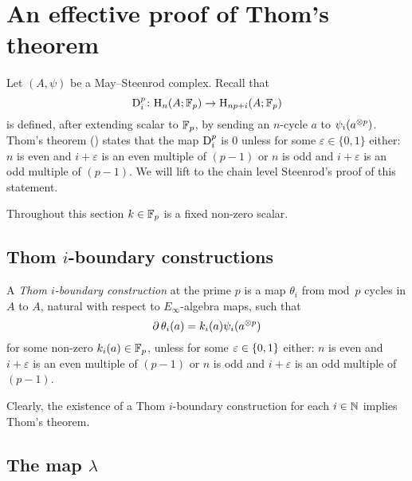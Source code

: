 
\appendix
\section{An effective proof of Thom's theorem}\label{s:thom}


Let $(A,\psi)$ be a May--Steenrod complex.
Recall that
\[
\mathrm{D}_i^p \colon \mathrm{H}_n(A; {\mathbb{F}_p}) \to \mathrm{H}_{np+i}(A; {\mathbb{F}_p})
\]
is defined, after extending scalar to ${\mathbb{F}_p}$, by sending an $n$-cycle $a$ to $\psi_i(a^{\otimes p})$.
Thom's theorem (\cite[218]{steenrod1953cyclic}) states that the map $\mathrm{D}_i^p$ is $0$ unless for some $\varepsilon \in \{0,1\}$ either: $n$ is even and $i+\varepsilon$ is an even multiple of $(p-1)$ or $n$ is odd and $i+\varepsilon$ is an odd multiple of $(p-1)$.
We will lift to the chain level Steenrod's proof of this statement.

Throughout this section $k \in {\mathbb{F}_p}$ is a fixed non-zero scalar.

\subsection{Thom $i$-boundary constructions}

A \textit{Thom $i$-boundary construction} at the prime $p$ is a map $\theta_i$ from mod~$p$ cycles in $A$ to $A$, natural with respect to $E_\infty$-algebra maps, such that
\[
\operatorname{\partial} \theta_i(a) = k_i(a) \psi_i(a^{\otimes p})
\]
for some non-zero $k_i(a) \in {\mathbb{F}_p}$, unless for some $\varepsilon \in \{0,1\}$ either: $n$ is even and $i+\varepsilon$ is an even multiple of $(p-1)$ or $n$ is odd and $i+\varepsilon$ is an odd multiple of $(p-1)$.

Clearly, the existence of a Thom $i$-boundary construction for each $i \in \mathbb{N}$ implies Thom's theorem.

\subsection{The map $\lambda$}

